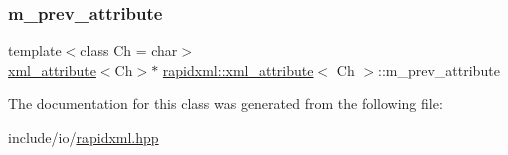 \subsubsection{\texorpdfstring{m\_prev\_attribute}{m\_prev\_attribute}}
{\footnotesize\ttfamily template$<$class Ch = char$>$ \\
\mbox{\hyperlink{classrapidxml_1_1xml__attribute}{xml\+\_\+attribute}}$<$Ch$>$$\ast$ \mbox{\hyperlink{classrapidxml_1_1xml__attribute}{rapidxml\+::xml\+\_\+attribute}}$<$ Ch $>$\+::m\+\_\+prev\+\_\+attribute\hspace{0.3cm}{\ttfamily [private]}}



The documentation for this class was generated from the following file\+:\begin{DoxyCompactItemize}
\item 
include/io/\mbox{\hyperlink{rapidxml_8hpp}{rapidxml.\+hpp}}\end{DoxyCompactItemize}
